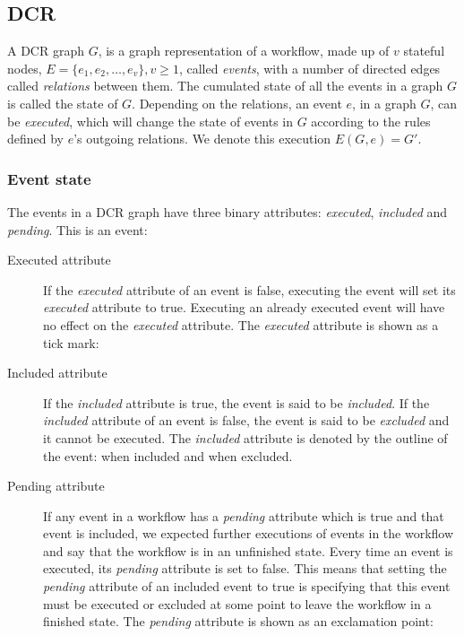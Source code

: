 \documentclass{article}
\begin{document}
	\subsection{DCR}
	\label{subsec:dcr}

	A DCR graph $G$, is a graph representation of a workflow, made up of $v$ stateful nodes, $E=\{e_1, e_2, \dots, e_v\}, v \geq 1$, called \textit{events}, with a number of directed edges called \textit{relations} between them.
	The cumulated state of all the events in a graph $G$ is called the state of $G$.
	Depending on the relations, an event $e$, in a graph $G$, can be \textit{executed}, which will change the state of events in $G$ according to the rules defined by $e$'s outgoing relations.
	We denote this execution $E(G,e)=G'$.

			\subsubsection*{Event state}

			The events in a DCR graph have three binary attributes: \textit{executed}, \textit{included} and \textit{pending}.
			This is an event: 

			\begin{description}
				\item[Executed attribute] If the \textit{executed} attribute of an event is false, executing the event will set its \textit{executed} attribute to true.
				Executing an already executed event will have no effect on the \textit{executed} attribute.
				The \textit{executed} attribute is shown as a tick mark: 
				\item[Included attribute] If the \textit{included} attribute is true, the event is said to be \textit{included}.
				If the \textit{included} attribute of an event is false, the event is said to be \textit{excluded} and it cannot be executed.
				The \textit{included} attribute is denoted by the outline of the event:  when included and  when excluded.
				\item[Pending attribute] If any event in a workflow has a \textit{pending} attribute which is true and that event is included, we expected further executions of events in the workflow and say that the workflow is in an unfinished state.
				Every time an event is executed, its \textit{pending} attribute is set to false.
				This means that setting the \textit{pending} attribute of an included event to true is specifying that this event must be executed or excluded at some point to leave the workflow in a finished state.
				The \textit{pending} attribute is shown as an exclamation point: 
			\end{description}
\end{document}
